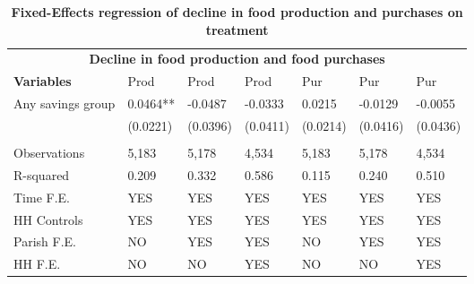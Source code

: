 \begin{table}[!h]
\centering
\begin{tabular}{lllllll}
 \hline
 \multicolumn{7}{c}{\bfseries  Decline in food production and food purchases} \\
\cline{1-7}
 {\bfseries Variables} & Prod & Prod & Prod & Pur
  & Pur & Pur\\
\hline
Any savings group & 0.0464** &	-0.0487	& -0.0333	& 0.0215	& -0.0129	& -0.0055 \\
 & (0.0221) &	(0.0396) &	(0.0411) &	(0.0214)	& (0.0416)	& (0.0436)  \\
  & \\
Observations & 5,183 &	5,178	& 4,534	& 5,183 &	5,178 & 	4,534
\\
R-squared & 0.209	& 0.332	& 0.586	& 0.115	& 0.240 &	0.510 \\
Time F.E. & YES & YES & YES & YES & YES & YES \\
HH Controls & YES & YES & YES & YES & YES & YES \\
Parish F.E. & NO & YES & YES & NO & YES & YES\\
HH F.E. & NO & NO & YES & NO & NO & YES \\ \hline
\cline{1-7}
\end{tabular}
\caption{\bfseries Fixed-Effects regression of decline in food production and purchases on treatment}
\hline\\
\end{table}








